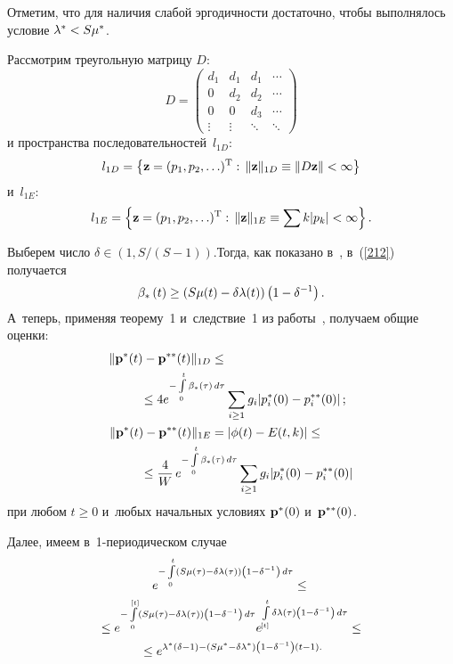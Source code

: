 \begin{multicols}{2}
Отметим, что для наличия слабой эргодичности достаточно, чтобы
выполнялось условие $\la^* \hm< S\mu^*$.

Рассмотрим треугольную матрицу $D$:
\begin{equation*}
D=\begin{pmatrix}
d_1   & d_1 & d_1 & \cdots  \\
0   & d_2  & d_2  &   \cdots  \\
0   & 0  & d_3  &   \cdots  \\
\vdots& \vdots & \ddots & \ddots 
\end{pmatrix}
\end{equation*}
и пространства  последовательностей~$l_{1D}$:
$$
l_{1D}=\left\{{\bf z} = (p_1,p_2,\ldots)^{\mathrm{T}} :\, \|{\bf z}\|_{1D}
\equiv \|D {\bf z}\| <\infty \right\}
 $$
и~$l_{1E}$:
$$
l_{1E}=\left\{{\bf z} = (p_1,p_2,\ldots)^{\mathrm{T}} :\, \|{\bf z}\|_{1E}
\equiv \sum k|p_k| <\infty \right\}.
$$



Выберем число $\delta \in \left(1,{S}/({S-1})\right)$.Тогда, как
показано в~\cite[параграф~4.2]{zbs}, в~(\ref{212}) получается
$$
\beta_*\left( t\right)  \ge \left(S\mu(t)\hm-\delta\la(t)\right)
\left(1-\delta^{-1}\right).
$$
А~теперь, применяя  теорему~1 и~следствие~1 из 
работы~\cite{Zeifman2014i}, получаем общие оценки:
\begin{align*}
\|{\bf p^*}(t) - {\bf p^{**}}(t)\|_{1D}  &\le{}\notag\\
&\hspace*{-20mm}{}\le 4 e^{-\int\limits_0^t
\beta_*(\tau)\, d\tau}\sum_{i \ge 1}g_i |p^*_i(0) - p^{**}_i(0)|\,;
\\
\|{\bf p^*}(t) - {\bf p^{**}}(t)\|_{1E}& = \left|\phi(t) - E(t,k)\right| \le {}\notag\\
&\hspace*{-20mm}{}\le
\fr{4}{W}\, e^{-\int\limits_0^t
\beta_*(\tau)\, d\tau}\sum\limits_{i \ge 1}g_i |p^*_i(0) - p^{**}_i(0)|
\end{align*} 
при любом $ t \ge 0$ и~любых начальных условиях ${\bf p^*}(0)$ и~${\bf p^{**}}(0)$.



Далее, имеем в~1-пе\-рио\-ди\-че\-ском случае
\begin{multline*}
e^{-\int\limits_0^t \left(S\mu(\tau)-\delta\lambda(\tau)\right)\left(
1-\delta^{-1}\right)\, d\tau} \le{}\\
{}\le
 e^{-\int\limits_0^{[t]}
\left(S\mu(\tau)-\delta\lambda(\tau)\right)\left(1-\delta^{-1}\right)\,
d\tau} e^{\int\limits_{[t]}^t
\delta\lambda(\tau)\left(1-\delta^{-1}\right)\, d\tau}\le{}\\
{}\le
e^{\lambda^*\left(\delta - 1\right)-
\left(S\mu^*-\delta\lambda^*\right)\left(1-\delta^{-1}\right)\left(t-1\right).
}
\end{multline*}


\end{multicols}
